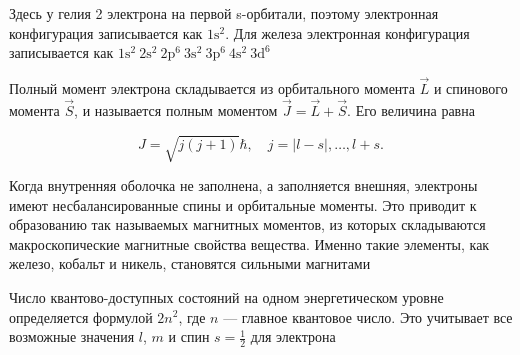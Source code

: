 \documentclass[12pt]{article}
\begin{document}
\begin{center}
\end{center}

Здесь у гелия 2 электрона на первой s-орбитали, поэтому электронная конфигурация записывается как $1\text{s}^2$. Для железа электронная конфигурация записывается как $1\text{s}^2\ 2\text{s}^2\ 2\text{p}^6\ 3\text{s}^2\ 3\text{p}^6\ 4\text{s}^2\ 3\text{d}^6$

\mediumvspace

Полный момент электрона складывается из орбитального момента $\vec L$ и спинового момента $\vec S$, и называется полным моментом $\vec J = \vec L + \vec S$. Его величина равна

\[
J = \sqrt{j(j+1)} \hbar, \quad j = |l-s|, \dots, l+s.
\]

Когда внутренняя оболочка не заполнена, а заполняется внешняя, электроны имеют несбалансированные спины и орбитальные моменты. Это приводит к образованию так называемых магнитных моментов, из которых складываются макроскопические магнитные свойства вещества. Именно такие элементы, как железо, кобальт и никель, становятся сильными магнитами

\smallvspace

Число квантово-доступных состояний на одном энергетическом уровне определяется формулой $2 n^2$, где $n$ — главное квантовое число. Это учитывает все возможные значения $l$, $m$ и спин $s = \frac12$ для электрона

\smallvspace
\end{document}
